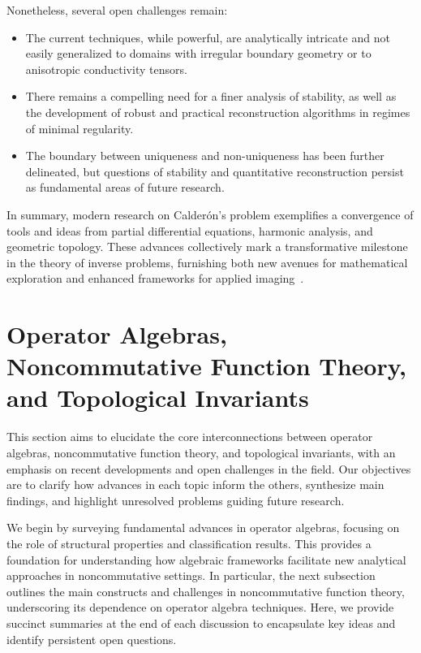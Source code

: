 \documentclass[sigconf]{acmart}
\begin{document}
Nonetheless, several open challenges remain:

\begin{itemize}
    \item The current techniques, while powerful, are analytically intricate and not easily generalized to domains with irregular boundary geometry or to anisotropic conductivity tensors.
    \item There remains a compelling need for a finer analysis of stability, as well as the development of robust and practical reconstruction algorithms in regimes of minimal regularity.
    \item The boundary between uniqueness and non-uniqueness has been further delineated, but questions of stability and quantitative reconstruction persist as fundamental areas of future research.
\end{itemize}

In summary, modern research on Calderón's problem exemplifies a convergence of tools and ideas from partial differential equations, harmonic analysis, and geometric topology. These advances collectively mark a transformative milestone in the theory of inverse problems, furnishing both new avenues for mathematical exploration and enhanced frameworks for applied imaging~\cite{ref102}.

\section{Operator Algebras, Noncommutative Function Theory, and Topological Invariants}
This section aims to elucidate the core interconnections between operator algebras, noncommutative function theory, and topological invariants, with an emphasis on recent developments and open challenges in the field. Our objectives are to clarify how advances in each topic inform the others, synthesize main findings, and highlight unresolved problems guiding future research.

We begin by surveying fundamental advances in operator algebras, focusing on the role of structural properties and classification results. This provides a foundation for understanding how algebraic frameworks facilitate new analytical approaches in noncommutative settings. In particular, the next subsection outlines the main constructs and challenges in noncommutative function theory, underscoring its dependence on operator algebra techniques. Here, we provide succinct summaries at the end of each discussion to encapsulate key ideas and identify persistent open questions.
\end{document}
